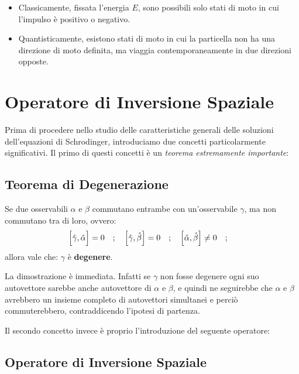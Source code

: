 \begin{itemize}
	\item Classicamente, fissata l’energia $E$, sono possibili solo stati di moto in cui l’impulso è positivo o negativo.
	\item Quantisticamente, esistono stati di moto in cui la particella non ha una direzione di moto definita, ma viaggia contemporaneamente in due direzioni opposte.
\end{itemize}

\section{Operatore di Inversione Spaziale}

	Prima di procedere nello studio delle caratteristiche generali delle soluzioni dell'equazioni di Schrodinger, introduciamo due concetti particolarmente significativi. Il primo di questi concetti è un \textit{teorema estremamente importante}:

\subsection{Teorema di Degenerazione}
	
\begin{myth}
	Se due osservabili $\alpha$ e $\beta$ commutano entrambe con un'osservabile $\gamma$, ma non commutano tra di loro, ovvero:
\begin{align*}
	\qty\Big[\hat{\gamma}, \hat{\alpha}] = 0 \quad ; \quad \qty[\hat{\gamma}, \hat{\beta}] = 0 \quad ; \quad \qty[\hat{\alpha}, \hat{\beta}] \neq 0 \quad ; \quad 
\end{align*}
	allora vale che: $\gamma$ è \textbf{degenere}.
\end{myth}

\begin{myprf}
	La dimostrazione è immediata. Infatti se $\gamma$ non fosse degenere ogni suo autovettore sarebbe anche autovettore di $\alpha$ e $\beta$, e quindi ne seguirebbe che $\alpha$ e $\beta$ avrebbero un insieme completo di autovettori simultanei e perciò commuterebbero, contraddicendo l'ipotesi di partenza.
\end{myprf}

	Il secondo concetto invece è proprio l'introduzione del seguente operatore:

\subsection{Operatore di Inversione Spaziale}

